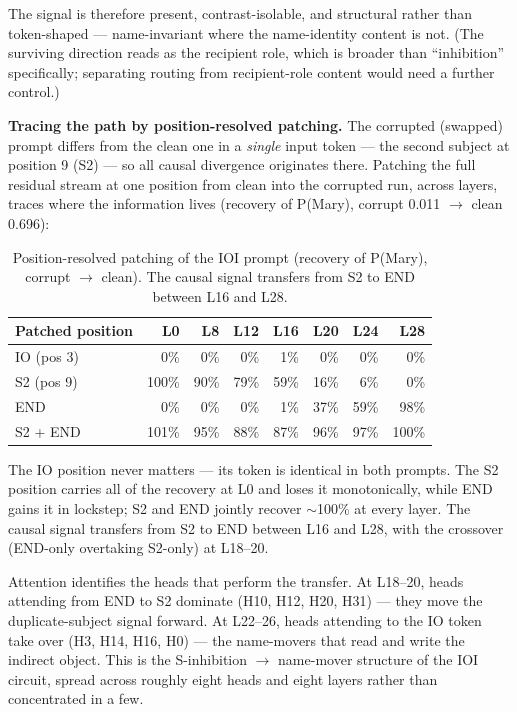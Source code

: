 \documentclass[11pt]{article}
\begin{document}
The signal is therefore present, contrast-isolable, and structural rather than
token-shaped --- name-invariant where the name-identity content is not. (The
surviving direction reads as the recipient role, which is broader than
``inhibition'' specifically; separating routing from recipient-role content would
need a further control.)

\textbf{Tracing the path by position-resolved patching.} The corrupted (swapped)
prompt differs from the clean one in a \emph{single} input token --- the second
subject at position 9 (S2) --- so all causal divergence originates there. Patching
the full residual stream at one position from clean into the corrupted run,
across layers, traces where the information lives (recovery of P(Mary), corrupt
0.011 $\rightarrow$ clean 0.696):

\begin{table}[htbp]
\centering
\small
\begin{tabular}{lrrrrrrr}
\toprule
Patched position & L0 & L8 & L12 & L16 & L20 & L24 & L28 \\
\midrule
IO (pos 3) & 0\% & 0\% & 0\% & 1\% & 0\% & 0\% & 0\% \\
S2 (pos 9) & 100\% & 90\% & 79\% & 59\% & 16\% & 6\% & 0\% \\
END & 0\% & 0\% & 0\% & 1\% & 37\% & 59\% & 98\% \\
S2 + END & 101\% & 95\% & 88\% & 87\% & 96\% & 97\% & 100\% \\
\bottomrule
\end{tabular}
\caption{Position-resolved patching of the IOI prompt (recovery of P(Mary), corrupt $\rightarrow$ clean). The causal signal transfers from S2 to END between L16 and L28.}
\label{tab:ioi-path}
\end{table}

The IO position never matters --- its token is identical in both prompts. The S2
position carries all of the recovery at L0 and loses it monotonically, while END
gains it in lockstep; S2 and END jointly recover $\sim$100\% at every layer. The
causal signal transfers from S2 to END between L16 and L28, with the crossover
(END-only overtaking S2-only) at L18--20.

Attention identifies the heads that perform the transfer. At L18--20, heads
attending from END to S2 dominate (H10, H12, H20, H31) --- they move the
duplicate-subject signal forward. At L22--26, heads attending to the IO token
take over (H3, H14, H16, H0) --- the name-movers that read and write the indirect
object. This is the S-inhibition $\rightarrow$ name-mover structure of the IOI circuit,
spread across roughly eight heads and eight layers rather than concentrated in a
few.
\end{document}
